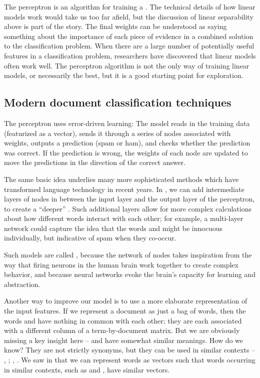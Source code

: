 The perceptron is an algorithm for training a . The technical details of how linear models work would take
us too far afield, but the discussion of linear separability above is
part of the story.  The final weights can be understood as saying
something about the importance of each piece of evidence in a combined
solution to the classification problem. When there are a large number
of potentially useful features in a classification problem,
researchers have discovered that linear models often work well. The
perceptron algorithm is not the only way of training linear models, or
necessarily the best, but it is a good starting point for exploration.

\subsection{Modern document classification techniques}
\largerpage
The perceptron uses error-driven learning: The model reads in the training data (featurized as a vector), sends it through a series of nodes associated with weights, outputs  a prediction (spam or ham), and checks whether the prediction was correct.  If the prediction is wrong, the weights of each node are updated to move the predictions in the direction of the correct answer.

The same basic idea underlies many more sophisticated methods which have transformed language technology in recent years.  In , we can add intermediate layers of nodes in between the input layer and the output layer of the perceptron, to create a ``deeper'' . Such additional layers allow for more complex calculations about how different words interact with each other; for example, a multi-layer network could capture the idea that the words  and  might be innocuous individually, but indicative of spam when they co-occur.

Such models are called , because the network of nodes takes inspiration from the way that firing neurons in the human brain work together to create complex behavior, and because neural networks evoke the brain's capacity for learning and abstraction.

Another way to improve our model is to use a more elaborate representation of the input features.  If we represent a document as just a bag of words, then the words  and  have nothing in common with each other; they are each associated with a different column of a term-by-document matrix.  But we are obviously missing a key insight here --  and  have somewhat similar meanings.  How do we know?  They are not strictly synonyms, but they can be used in similar contexts -- , ; , .  We saw in  that we can represent words as vectors such that words occurring in similar contexts, such as  and , have similar vectors.


